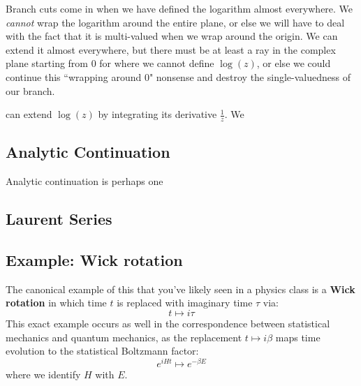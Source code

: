 \documentclass[11pt, oneside]{article}   	%
\theoremstyle{definition}
\begin{document}
Branch cuts come in when we have defined the logarithm almost everywhere. We \textit{cannot} wrap the logarithm around the 
entire plane, or else we will have to deal with the fact that it is multi-valued when we wrap around the origin. We can extend it 
almost everywhere, but there must be at least a ray in the complex plane starting from 0 for where we cannot define $\log(z)$, 
or else we could continue this ``wrapping around 0" nonsense and destroy the single-valuedness of our branch. 

 can extend $\log(z)$ by integrating its derivative $\frac{1}{z}$. We


\subsection{Analytic Continuation}

Analytic continuation is perhaps one

\subsection{Laurent Series}

\subsection{Example: Wick rotation}

The canonical example of this that you've likely seen in a physics class is a \textbf{Wick rotation} in which time $t$ is replaced 
with imaginary time $\tau$ via:
\begin{equation}
	t\mapsto i\tau
\end{equation}
This exact example occurs as well in the correspondence between statistical mechanics and quantum mechanics, as the 
replacement $t\mapsto i\beta$ maps time evolution to the statistical Boltzmann factor:
\begin{equation}
	e^{iHt}\mapsto e^{-\beta E}
\end{equation}
where we identify $H$ with $E$.
\end{document}
